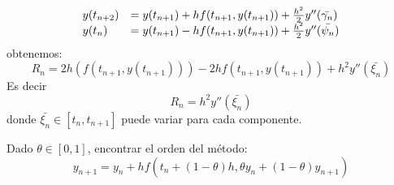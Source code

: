 \begin{equation*}
\begin{array}{l l}
y(t_{n+2}) & = y(t_{n+1})+hf(t_{n+1}, y(t_{n+1})) + \frac{h^2}{2}y''(\bar{\gamma_n})\\
y(t_{n}) & = y(t_{n+1})-hf(t_{n+1}, y(t_{n+1})) + \frac{h^2}{2}y''(\bar{\psi_n})\\
\end{array}
\end{equation*}
obtenemos:
$$R_n = 2h(f(t_{n+1}, y(t_{n+1}))) - 2hf(t_{n+1}, y(t_{n+1})) + h^2y''(\bar{\xi_n})$$
Es decir
$$R_n = h^2y''(\bar{\xi_n})$$
donde $\bar{\xi_n} \in [t_n, t_{n+1}]$ puede variar para cada componente.



\begin{mathproblem}{5}
Dado $\theta \in [0,1]$, encontrar el orden del método:
$$y_{n+1}=y_n+hf(t_n+(1-\theta)h, \theta y_n+(1-\theta)y_{n+1})$$
\end{mathproblem}

\color{red}{Estamos en ello.}